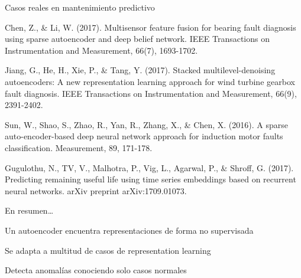 \documentclass[13.5pt,aspectratio=169]{beamer}
\begin{document}
     \begin{frame}{Casos reales en mantenimiento predictivo}
      \begin{fullpageitemize}
         \small
         \item \textcolor{colordgray}{Chen, Z., \& Li, W. (2017). }Multisensor feature fusion for bearing fault diagnosis using sparse autoencoder and deep belief network. \textcolor{colordgray}{IEEE Transactions on Instrumentation and Measurement, 66(7), 1693-1702.}
         \item \textcolor{colordgray}{Jiang, G., He, H., Xie, P., \& Tang, Y. (2017). }Stacked multilevel-denoising autoencoders: A new representation learning approach for wind turbine gearbox fault diagnosis. \textcolor{colordgray}{IEEE Transactions on Instrumentation and Measurement, 66(9), 2391-2402.}
         \item \textcolor{colordgray}{Sun, W., Shao, S., Zhao, R., Yan, R., Zhang, X., \& Chen, X. (2016). }A sparse auto-encoder-based deep neural network approach for induction motor faults classification. \textcolor{colordgray}{Measurement, 89, 171-178.}
         \item \textcolor{colordgray}{Gugulothu, N., TV, V., Malhotra, P., Vig, L., Agarwal, P., \& Shroff, G. (2017). }Predicting remaining useful life using time series embeddings based on recurrent neural networks. \textcolor{colordgray}{arXiv preprint arXiv:1709.01073.}
      \end{fullpageitemize}
     \end{frame}
     
     
     \begin{frame}{En resumen\dots}
      \begin{fullpageitemize}
        \item Un autoencoder encuentra representaciones de forma no supervisada     
        \item Se adapta a multitud de casos de representation learning
        \item Detecta anomalías conociendo solo casos normales
      \end{fullpageitemize}
     \end{frame}
     

    
\end{document}

